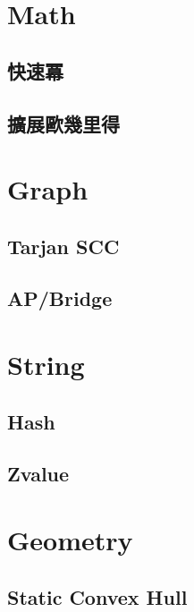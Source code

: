 \section{Math}
\subsection{快速冪} 

\subsection{擴展歐幾里得} 


\section{Graph}
\subsection{Tarjan SCC} 

\subsection{AP/Bridge} 


\section{String}
\subsection{Hash} 

\subsection{Zvalue} 


\section{Geometry}
\subsection{Static Convex Hull} 
